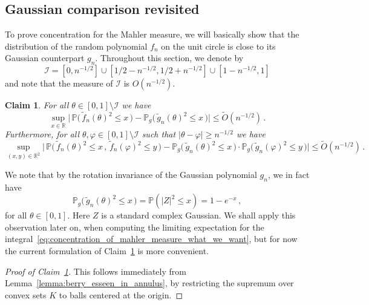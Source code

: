 \documentclass[11pt]{amsart}
\newtheorem{claim}[theorem]{Claim}
\theoremstyle{remark}
\theoremstyle{definition}
\newcommand{\bR}{\mathbb R}
\newcommand{\bP}{\mathbb P}
\begin{document}
    \subsection{Gaussian comparison revisited}
    To prove concentration for the Mahler measure, we will basically show that the distribution of the random polynomial $f_n$ on the unit circle is close to its Gaussian counterpart $g_n$. Throughout this section, we denote by 
    \begin{equation}
        \label{eq:def_of_I}
        \mathcal{I}  = [0,n^{-1/2}]\cup[1/2-n^{-1/2},1/2+n^{-1/2}]\cup[1-n^{-1/2},1] 
    \end{equation}
    and note that the measure of $\mathcal{I}$ is $O(n^{-1/2})$. 
    \begin{claim}
        \label{claim:gaussian_comparison_CDF_on_unit_circle}
        For all $\theta \in [0,1]\setminus \mathcal{I}$ we have
        \[
        \sup_{x\in \bR} \Big| \, \bP\big( \, \widetilde{f}_n(\theta)^2 \le x \, \big) - \bP_g\big( \, \widetilde{g}_n(\theta)^2 \le x \, \big) \Big| \le \widetilde{O}(n^{-1/2}) \, .
        \]
        Furthermore, for all $\theta,\varphi \in  [0,1]\setminus \mathcal{I}$ such that $|\theta-\varphi| \ge n^{-1/2}$ we have
        \[
        \sup_{(x,y)\in \bR^2} \Big| \, \bP\big( \, \widetilde{f}_n(\theta)^2 \le x \, , \,  \widetilde{f}_n(\varphi)^2 \le y \, \big) - \bP_g\big( \, \widetilde{g}_n(\theta)^2 \le x \, \big) \cdot \bP_g\big( \, \widetilde{g}_n(\varphi)^2 \le y \, \big) \Big| \le \widetilde{O}(n^{-1/2}) \, .
        \]
    \end{claim}
    \noindent
    We note that by the rotation invariance of the Gaussian polynomial $g_n$, we in fact have
    \begin{equation*}
        \bP_g\big( \, \widetilde{g}_n(\theta)^2 \le x \, \big) = \bP(|Z|^2 \le x) = 1-e^{-x} \, ,
    \end{equation*}
    for all $\theta\in [0,1]$. Here $Z$ is a standard complex Gaussian. We shall apply this observation later on, when computing the limiting expectation for the integral~\eqref{eq:concentration_of_mahler_measure_what_we_want}, but for now the current formulation of Claim~\ref{claim:gaussian_comparison_CDF_on_unit_circle} is more convenient. 
    \begin{proof}[Proof of Claim~\ref{claim:gaussian_comparison_CDF_on_unit_circle}]
        This follows immediately from Lemma~\ref{lemma:berry_esseen_in_annulus}, by restricting the supremum over convex sets $K$ to balls centered at the origin. 
    \end{proof}
\end{document}
